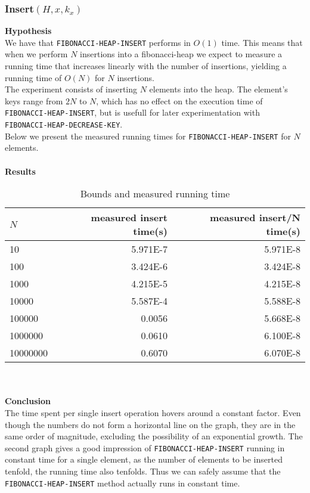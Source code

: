 \documentclass[a4paper,10pt]{article}
\begin{document}
\subsubsection{Insert$(H,x,k_x)$}
{\bf Hypothesis}\\
We have that \texttt{FIBONACCI-HEAP-INSERT} performs in $O(1)$ time. This means that when we perform $N$ insertions into a fibonacci-heap we expect to measure a running time that increases linearly with the number of insertions, yielding a running time of $O(N)$ for $N$ insertions.\\
The experiment consists of inserting $N$ elements into the heap. The element's keys range from $2N$ to $N$, which has no effect on the execution time of \texttt{FIBONACCI\--HEAP\--INSERT}, but is usefull for later experimentation with \texttt{FIBONACCI\--HEAP\--DECREASE\--KEY}.\\
Below we present the measured running times for \texttt{FIBONACCI\--HEAP\--INSERT} for $N$ elements.\\\\
{\bf Results}
\begin{table}
  \begin{center}
    \begin{tabular}{l|r|r}
      $N$ & measured insert time(s) & measured insert/N time(s)\\
      \hline
      10       & \num{5.971E-7}     & \num{5.971E-8}\\
      100      & \num{3.424E-6}     & \num{3.424E-8}\\
      1000     & \num{4.215E-5}     & \num{4.215E-8}\\
      10000    & \num{5.587E-4}     & \num{5.588E-8}\\
      100000   & \num{0.0056}       & \num{5.668E-8}\\
      1000000  & \num{0.0610}       & \num{6.100E-8}\\
      10000000 & \num{0.6070}       & \num{6.070E-8}
    \end{tabular}
    \caption{Bounds and measured running time}
  \end{center}
\end{table}\\\\
{\bf Conclusion}\\
The time spent per single insert operation hovers around a constant factor. Even though the numbers do not form a horizontal line on the graph, they are in the same order of magnitude, excluding the possibility of an exponential growth. The second graph gives a good impression of \texttt{FIBONACCI-HEAP-INSERT} running in constant time for a single element, as the number of elements to be inserted tenfold, the running time also tenfolds. Thus we can safely assume that the \texttt{FIBONACCI-HEAP-INSERT} method actually runs in constant time.
\end{document}
